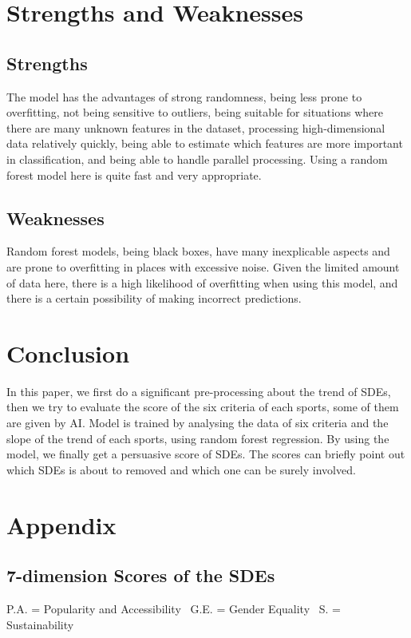 \documentclass[a4paper]{article}
\begin{document}
\section{Strengths and Weaknesses}

\subsection{Strengths}
The model has the advantages of strong randomness, being less prone to overfitting, not being sensitive to outliers, being suitable for situations where there are many unknown features in the dataset, processing high-dimensional data relatively quickly, being able to estimate which features are more important in classification, and being able to handle parallel processing. Using a random forest model here is quite fast and very appropriate.%
\subsection{Weaknesses}
Random forest models, being black boxes, have many inexplicable aspects and are prone to overfitting in places with excessive noise. Given the limited amount of data here, there is a high likelihood of overfitting when using this model, and there is a certain possibility of making incorrect predictions.%
\section{Conclusion}
In this paper, we first do a significant pre-processing about the trend of SDEs, then we try to evaluate the score of the six criteria of each sports, some of them are given by AI. Model is trained by analysing the data of six criteria and the slope of the trend of each sports, using random forest regression. By using the model, we finally get a persuasive score of SDEs. The scores can briefly point out which SDEs is about to removed and which one can be surely involved.
\section{Appendix}
\subsection{7-dimension Scores of the SDEs}
P.A. = Popularity and Accessibility \ G.E. = Gender Equality \ S. = Sustainability
\end{document}
